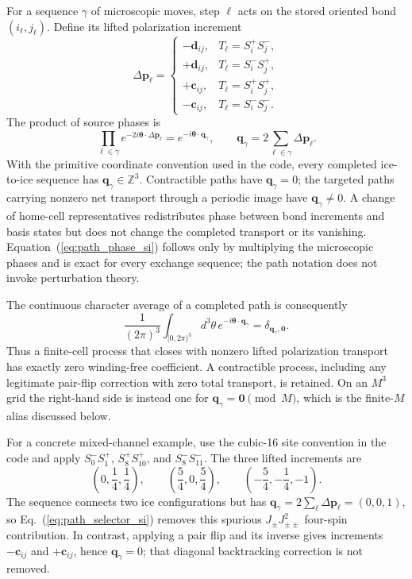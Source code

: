\documentclass[aps,prl,onecolumn,amsmath,amssymb]{revtex4-2}
\newcommand{\Jpm}{J_{\pm}}
\newcommand{\Jpp}{J_{\pm\pm}}
\newcommand{\bq}{\bm q}
\newcommand{\btheta}{\bm\theta}
\begin{document}
For a sequence $\gamma$ of microscopic moves, step $\ell$ acts on the stored
oriented bond $(i_\ell,j_\ell)$.  Define its lifted polarization increment
\begin{equation}
 \Delta\bm p_\ell=\begin{cases}
 -\bm d_{ij},&T_\ell=S_i^+S_j^-,\\
 +\bm d_{ij},&T_\ell=S_i^-S_j^+,\\
 +\bm c_{ij},&T_\ell=S_i^+S_j^+,\\
 -\bm c_{ij},&T_\ell=S_i^-S_j^-.
 \end{cases}
\label{eq:polarization_increment_si}
\end{equation}
The product of source phases is
\begin{equation}
 \prod_{\ell\in\gamma}e^{-2i\btheta\cdot\Delta\bm p_\ell}
 =e^{-i\btheta\cdot\bq_\gamma},
 \qquad
 \bq_\gamma=2\sum_{\ell\in\gamma}\Delta\bm p_\ell.
\label{eq:path_phase_si}
\end{equation}
With the primitive coordinate convention used in the code, every completed
ice-to-ice sequence has $\bq_\gamma\in\mathbb Z^3$.  Contractible paths have
$\bq_\gamma=0$; the targeted paths carrying nonzero net transport through a
periodic image have $\bq_\gamma\ne0$.  A change of home-cell representatives
redistributes phase between bond increments and basis states but does not
change the completed transport or its vanishing.
Equation~(\ref{eq:path_phase_si}) follows only by multiplying the microscopic
phases and is exact for every exchange sequence; the path notation does not
invoke perturbation theory.

The continuous character average of a completed path is consequently
\begin{equation}
 \frac{1}{(2\pi)^3}\int_{[0,2\pi)^3}d^3\theta\,
 e^{-i\btheta\cdot\bq_\gamma}
 =\delta_{\bq_\gamma,\bm0}.
\label{eq:path_selector_si}
\end{equation}
Thus a finite-cell process that closes with nonzero lifted polarization
transport has exactly zero winding-free coefficient.  A contractible process,
including any legitimate pair-flip correction with zero total transport, is
retained.  On an $M^3$ grid the right-hand side is instead one for
$\bq_\gamma=\bm0\pmod M$, which is the finite-$M$ alias discussed below.

For a concrete mixed-channel example, use the cubic-16 site convention in the
code and apply $S_0^-S_1^+$, $S_8^+S_{10}^+$, and
$S_8^-S_{11}^-$.  The three lifted increments are
\begin{equation}
 \left(0,\frac14,\frac14\right),\qquad
 \left(\frac54,0,\frac54\right),\qquad
 \left(-\frac54,-\frac14,-1\right).
\end{equation}
The sequence connects two ice configurations but has
$\bq_\gamma=2\sum_\ell\Delta\bm p_\ell=(0,0,1)$, so
Eq.~(\ref{eq:path_selector_si}) removes this spurious
$\Jpm\Jpp^2$ four-spin contribution.  In contrast, applying a pair flip and
its inverse gives increments $-\bm c_{ij}$ and $+\bm c_{ij}$, hence
$\bq_\gamma=0$; that diagonal backtracking correction is not removed.
\end{document}
